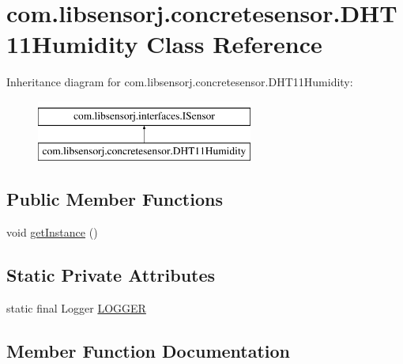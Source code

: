 \hypertarget{classcom_1_1libsensorj_1_1concretesensor_1_1DHT11Humidity}{}\section{com.\+libsensorj.\+concretesensor.\+D\+H\+T11\+Humidity Class Reference}
\label{classcom_1_1libsensorj_1_1concretesensor_1_1DHT11Humidity}
Inheritance diagram for com.\+libsensorj.\+concretesensor.\+D\+H\+T11\+Humidity\+:\begin{figure}[H]
\begin{center}
\leavevmode
\includegraphics[height=2.000000cm]{classcom_1_1libsensorj_1_1concretesensor_1_1DHT11Humidity}
\end{center}
\end{figure}
\subsection*{Public Member Functions}
\begin{DoxyCompactItemize}
\item 
void \hyperlink{classcom_1_1libsensorj_1_1concretesensor_1_1DHT11Humidity_a2355dc003abad8d519440e9f6871c422}{get\+Instance} ()
\end{DoxyCompactItemize}
\subsection*{Static Private Attributes}
\begin{DoxyCompactItemize}
\item 
static final Logger \hyperlink{classcom_1_1libsensorj_1_1concretesensor_1_1DHT11Humidity_a80655575ba16db014b7a1a797e030eae}{L\+O\+G\+G\+E\+R}
\end{DoxyCompactItemize}


\subsection{Member Function Documentation}
\hypertarget{classcom_1_1libsensorj_1_1concretesensor_1_1DHT11Humidity_a2355dc003abad8d519440e9f6871c422}{}
